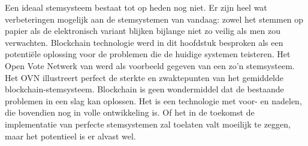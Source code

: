 	Een ideaal stemsysteem bestaat tot op heden nog niet. Er zijn heel wat verbeteringen mogelijk aan de stemsystemen van vandaag: zowel het stemmen op papier als de elektronisch variant blijken bijlange niet zo veilig als men zou verwachten. Blockchain technologie werd in dit hoofdstuk besproken als een potentiële oplossing voor de problemen die de huidige systemen teisteren. Het Open Vote Netwerk van \textcite{McCorry2017} werd als voorbeeld gegeven van een zo'n stemsysteem. Het OVN illustreert perfect de sterkte en zwaktepunten van het gemiddelde blockchain-stemsysteem. Blockchain is geen wondermiddel dat de bestaande problemen in een slag kan oplossen. Het is een technologie met  voor- en nadelen, die bovendien nog in volle ontwikkeling is. Of het in de toekomst de implementatie van perfecte stemsystemen zal toelaten valt moeilijk te zeggen, maar het potentieel is er alvast wel. 
	
	

	
	
	
		
		
		
		
		
		
	
